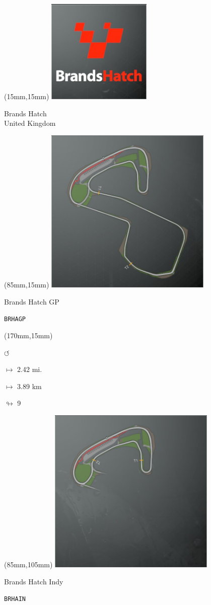 \begin{textblock*}{60mm}(15mm,15mm)%
\includegraphics[width=50mm]{LG/2015-05-20_00074.png}
\par Brands Hatch\\ United Kingdom
\end{textblock*}
\begin{textblock*}{80mm}(85mm,15mm)%
\includegraphics[width=80mm]{TR/2015-05-20_00007.png}
\centerline{Brands Hatch GP}
\par\hfill\tiny\tt BRHAGP\\
\end{textblock*}
\begin{textblock*}{30mm}(170mm,15mm)%
\par \Huge$\circlearrowleft$
\Large
\par$\mapsto$ 2.42 mi.
\par$\mapsto$ 3.89 km
\par$\looparrowright$ 9
\end{textblock*}
\begin{textblock*}{80mm}(85mm,105mm)%
\includegraphics[width=80mm]{TR/2015-05-20_00008.png}
\centerline{Brands Hatch Indy}
\par\hfill\tiny\tt BRHAIN\\
\end{textblock*}
